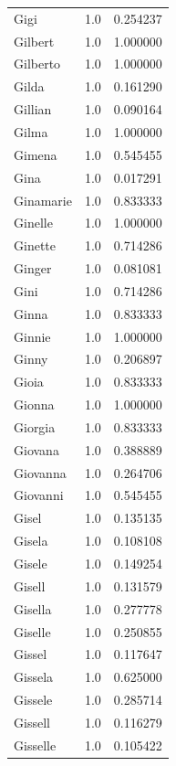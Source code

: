 \documentclass[
  letterpaper,
  DIV=11,
  numbers=noendperiod]{scrreprt}
\begin{document}
\begin{tabular}{lrr}
Gigi            &   1.0 &   0.254237 \\
Gilbert         &   1.0 &   1.000000 \\
Gilberto        &   1.0 &   1.000000 \\
Gilda           &   1.0 &   0.161290 \\
Gillian         &   1.0 &   0.090164 \\
Gilma           &   1.0 &   1.000000 \\
Gimena          &   1.0 &   0.545455 \\
Gina            &   1.0 &   0.017291 \\
Ginamarie       &   1.0 &   0.833333 \\
Ginelle         &   1.0 &   1.000000 \\
Ginette         &   1.0 &   0.714286 \\
Ginger          &   1.0 &   0.081081 \\
Gini            &   1.0 &   0.714286 \\
Ginna           &   1.0 &   0.833333 \\
Ginnie          &   1.0 &   1.000000 \\
Ginny           &   1.0 &   0.206897 \\
Gioia           &   1.0 &   0.833333 \\
Gionna          &   1.0 &   1.000000 \\
Giorgia         &   1.0 &   0.833333 \\
Giovana         &   1.0 &   0.388889 \\
Giovanna        &   1.0 &   0.264706 \\
Giovanni        &   1.0 &   0.545455 \\
Gisel           &   1.0 &   0.135135 \\
Gisela          &   1.0 &   0.108108 \\
Gisele          &   1.0 &   0.149254 \\
Gisell          &   1.0 &   0.131579 \\
Gisella         &   1.0 &   0.277778 \\
Giselle         &   1.0 &   0.250855 \\
Gissel          &   1.0 &   0.117647 \\
Gissela         &   1.0 &   0.625000 \\
Gissele         &   1.0 &   0.285714 \\
Gissell         &   1.0 &   0.116279 \\
Gisselle        &   1.0 &   0.105422 \\

\end{tabular}
\end{document}
